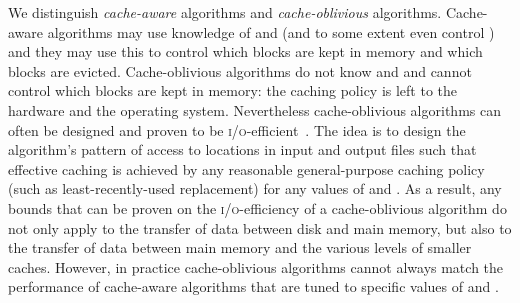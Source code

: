 \documentclass[10pt,a4paper]{article}
\def\io{\textsc{i/o}\xspace}
\begin{document}
We distinguish \emph{cache-aware} algorithms and \emph{cache-oblivious} algorithms. Cache-aware algorithms may use knowledge of  and  (and to some extent even control ) and they may use this to control which blocks are kept in memory and which blocks are evicted. Cache-oblivious algorithms do not know  and  and cannot control which blocks are kept in memory: the caching policy is left to the hardware and the operating system. Nevertheless cache-oblivious algorithms can often be designed and proven to be \io-efficient~\cite{flpr-coa-99}. The idea is to design the algorithm's pattern of access to locations in input and output files such that effective caching is achieved by any reasonable general-purpose caching policy (such as least-recently-used replacement) for any values of  and . As a result, any bounds that can be proven on the \io-efficiency of a cache-oblivious algorithm do not only apply to the transfer of data between disk and main memory, but also to the transfer of data between main memory and the various levels of smaller caches. However, in practice cache-oblivious algorithms cannot always match the performance of cache-aware algorithms that are tuned to specific values of  and .
\end{document}

